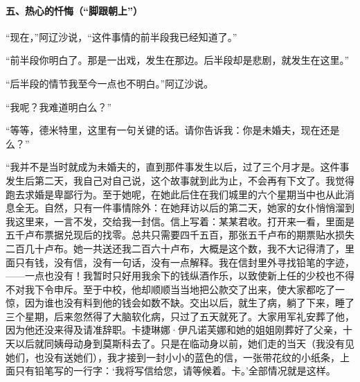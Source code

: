 \paragraph*{五、热心的忏悔（“脚跟朝上”）}
\par “现在，”阿辽沙说，“这件事情的前半段我已经知道了。”
\par “前半段你明白了。那是一出戏，发生在那边。后半段却是悲剧，就发生在这里。”
\par “后半段的情节我至今一点也不明白。”阿辽沙说。
\par “我呢？我难道明白么？”
\par “等等，德米特里，这里有一句关键的话。请你告诉我：你是未婚夫，现在还是么？”
\par “我并不是当时就成为未婚夫的，直到那件事发生以后，过了三个月才是。这件事发生后第二天，我自己对自己说，这个故事就到此为止，不会再有下文了。我觉得跑去求婚是卑鄙行为。至于她呢，在她此后住在我们城里的六个星期当中也从此消息全无。自然，只有一件事情除外：在她拜访以后的第二天，她家的女仆悄悄溜到我这里来，一言不发，交给我一封信。信上写着：某某君收。打开来一看，里面是五千卢布票据兑现后的找零。总共只需要四千五百，那张五千卢布的期票贴水损失二百几十卢布。她一共送还我二百六十卢布，大概是这个数，我不大记得清了，里面只有钱，没有信，没有一句话，没有一点解释。我在信封里外寻找铅笔的字迹，——一点也没有！我暂时只好用我余下的钱纵酒作乐，以致使新上任的少校也不得不对我下令申斥。至于中校，他却顺顺当当地把公款交了出来，使大家都吃了一惊，因为谁也没有料到他的钱会如数不缺。交出以后，就生了病，躺了下来，睡了三个星期，后来忽然得了大脑软化病，只过了五天就死了。大家用军礼安葬了他，因为他还没来得及请准辞职。卡捷琳娜·伊凡诺芙娜和她的姐姐刚葬好了父亲，十天以后就同姨母动身到莫斯科去了。只是在临动身以前，她们走的当天（我没有见她们，也没有送她们），我才接到一封小小的蓝色的信，一张带花纹的小纸条，上面只有铅笔写的一行字：‘我将写信给您，请等候着。卡。’全部情况就是这样。

